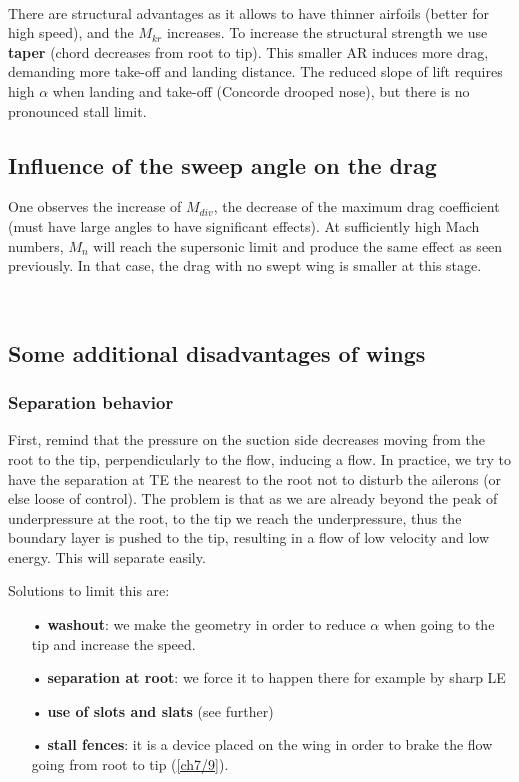 	\ \\ There are structural advantages as it allows to have thinner airfoils (better for high speed), and the $M_{kr}$ increases. To increase the structural strength we use \textbf{taper} (chord decreases from root to tip). This smaller AR induces more drag, demanding more take-off and landing distance. The reduced slope of lift requires high $\alpha$ when landing and take-off (Concorde drooped nose), but there is no pronounced stall limit.    
	
\subsection{Influence of the sweep angle on the drag}	
	One observes the increase of $M_{div}$, the decrease of the maximum drag coefficient (must have large angles to have significant effects). At sufficiently high Mach numbers, $M_n$ will reach the supersonic limit and produce the same effect as seen previously. In that case, the drag with no swept wing is smaller at this stage. 
	
	\ \\
	
\subsection{Some additional disadvantages of wings}
\subsubsection{Separation behavior}
 	First, remind that the pressure on the suction side decreases moving from the root to the tip, perpendicularly to the flow, inducing a flow. In practice, we try to have the separation at TE the nearest to the root not to disturb the ailerons (or else loose of control). The problem is that as we are already beyond the peak of underpressure at the root, to the tip we reach the underpressure, thus the boundary layer is pushed to the tip, resulting in a flow of low velocity and low energy. This will separate easily. 
 	
 	
 	Solutions to limit this are: 
 	
 	\begin{itemize}
 	\item[•] \textbf{washout}: we make the geometry in order to reduce $\alpha$ when going to the tip and increase the speed.
 	
 	\item[•] \textbf{separation at root}: we force it to happen there for example by sharp LE
 	
 	\item[•] \textbf{use of slots and slats} (see further)
 	
 	\item[•] \textbf{stall fences}: it is a device placed on the wing in order to brake the flow going from root to tip (\autoref{ch7/9}).
 	\end{itemize}
 	
